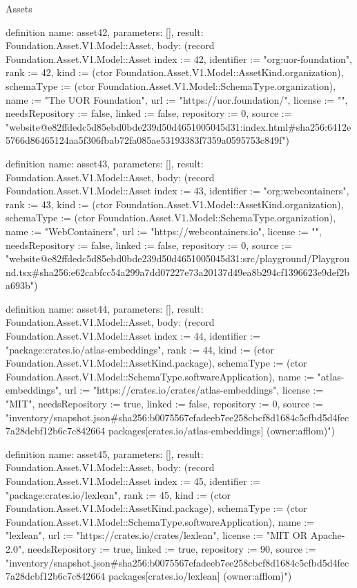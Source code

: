 \begin{lexlean}{Assets}
\begin{semanticmodule}
definition{
  name: asset42,
  parameters: [],
  result: Foundation.Asset.V1.Model::Asset,
  body: (record Foundation.Asset.V1.Model::Asset {index := 42, identifier := "org:uor-foundation", rank := 42, kind := (ctor Foundation.Asset.V1.Model::AssetKind.organization), schemaType := (ctor Foundation.Asset.V1.Model::SchemaType.organization), name := "The UOR Foundation", url := "https://uor.foundation/", license := "", needsRepository := false, linked := false, repository := 0, source := "website@e82ffdedc5d85ebd0bde239d50d4651005045d31:index.html#sha256:6412e5766d86465124aa5f306fbab72fa085ae53193383f7359a0595753c849f"})
}

definition{
  name: asset43,
  parameters: [],
  result: Foundation.Asset.V1.Model::Asset,
  body: (record Foundation.Asset.V1.Model::Asset {index := 43, identifier := "org:webcontainers", rank := 43, kind := (ctor Foundation.Asset.V1.Model::AssetKind.organization), schemaType := (ctor Foundation.Asset.V1.Model::SchemaType.organization), name := "WebContainers", url := "https://webcontainers.io", license := "", needsRepository := false, linked := false, repository := 0, source := "website@e82ffdedc5d85ebd0bde239d50d4651005045d31:src/playground/Playground.tsx#sha256:e62cabfcc54a299a7dd07227e73a20137d49ea8b294cf1396623e9def2ba693b"})
}

definition{
  name: asset44,
  parameters: [],
  result: Foundation.Asset.V1.Model::Asset,
  body: (record Foundation.Asset.V1.Model::Asset {index := 44, identifier := "package:crates.io/atlas-embeddings", rank := 44, kind := (ctor Foundation.Asset.V1.Model::AssetKind.package), schemaType := (ctor Foundation.Asset.V1.Model::SchemaType.softwareApplication), name := "atlas-embeddings", url := "https://crates.io/crates/atlas-embeddings", license := "MIT", needsRepository := true, linked := false, repository := 0, source := "inventory/snapshot.json#sha256:b0075567efadeeb7ee258cbcf8d1684c5cfbd5d4fec7a28dcbf12b6c7c842664 packages[crates.io/atlas-embeddings] (owner:afflom)"})
}

definition{
  name: asset45,
  parameters: [],
  result: Foundation.Asset.V1.Model::Asset,
  body: (record Foundation.Asset.V1.Model::Asset {index := 45, identifier := "package:crates.io/lexlean", rank := 45, kind := (ctor Foundation.Asset.V1.Model::AssetKind.package), schemaType := (ctor Foundation.Asset.V1.Model::SchemaType.softwareApplication), name := "lexlean", url := "https://crates.io/crates/lexlean", license := "MIT OR Apache-2.0", needsRepository := true, linked := true, repository := 90, source := "inventory/snapshot.json#sha256:b0075567efadeeb7ee258cbcf8d1684c5cfbd5d4fec7a28dcbf12b6c7c842664 packages[crates.io/lexlean] (owner:afflom)"})
}


\end{semanticmodule}
\end{lexlean}
